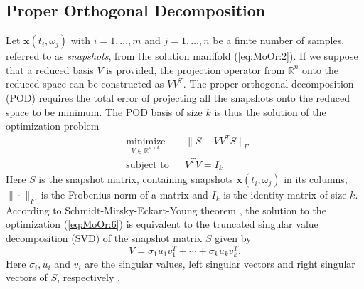 \subsection{Proper Orthogonal Decomposition} \label{chap:MoOr.PrOr:1}
Let $\mathbf x (t_i,\omega_j)$ with $i=1,\dots,m$ and $j=1,\dots,n$ be a finite number of samples, referred to as \emph{snapshots}, from the solution manifold (\ref{eq:MoOr:2}). If we {\edit suppose} that a reduced basis $V$ is provided, the projection operator from $\mathbb R^n$ onto the reduced space can be constructed as $VV^T$. The proper orthogonal decomposition (POD) requires the total error of projecting all the snapshots onto the reduced space to be minimum. The POD basis of size $k$ is thus the solution of the optimization problem
\begin{equation} \label{eq:MoOr:6}
\begin{aligned}
& \underset{V\in \mathbb R^{n\times k}}{\text{minimize}}
& & \| S - VV^TS\|_F \\
& \text{subject to}
& & V^TV = I_k
\end{aligned}
\end{equation}
Here $S$ is the snapshot matrix, containing snapshots $\mathbf x(t_i,\omega_j)$ in its columns, $\|\cdot \|_F$ is the Frobenius norm of a matrix and $I_k$ is the identity matrix of size $k$. According to {\edit Schmidt-Mirsky-Eckart-Young theorem \cite{Markovsky:2011:LRA:2103589}}, the solution to the optimization (\ref{eq:MoOr:6}) is equivalent to the truncated singular value decomposition (SVD) of the snapshot matrix $S$ given by
\begin{equation} \label{eq:MoOr:7}
	V = \sigma_1 u_1 v^T_1 + \cdots + \sigma_k u_k v^T_k.
\end{equation}
Here $\sigma_i, u_i$ and $v_i$ are the singular values, left singular vectors and right singular vectors of $S$, respectively {\edit \cite{Markovsky:2011:LRA:2103589} }.


